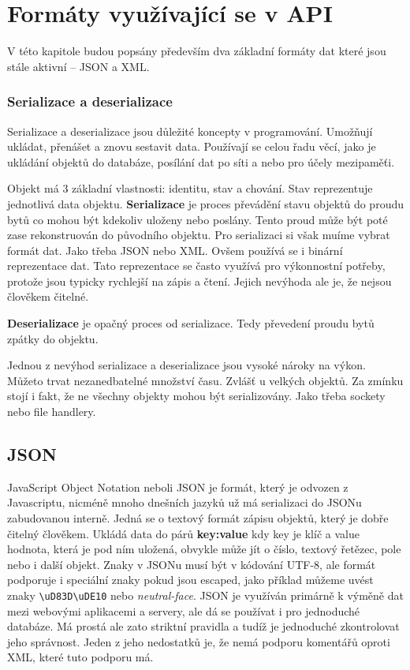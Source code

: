 \chapter{Formáty využívající se v API}
V této kapitole budou popsány především dva základní formáty dat které jsou stále aktivní -- JSON a XML.


\subsection*{Serializace a deserializace} %
Serializace a deserializace jsou důležité koncepty v programování. Umožňují ukládat, přenášet a znovu sestavit data. Používají se celou řadu věcí, jako je ukládání objektů do databáze, posílání dat po síti a nebo pro účely mezipaměťi.

Objekt má 3 základní vlastnosti: identitu, stav a chování. Stav reprezentuje jednotlivá data objektu.
\textbf{Serializace} je proces převádění stavu objektů do proudu bytů co mohou být kdekoliv uloženy nebo poslány. Tento proud může být poté zase rekonstruován do původního objektu. Pro serializaci si však muíme vybrat formát dat. Jako třeba JSON nebo XML. Ovšem používá se i binární reprezentace dat. Tato reprezentace se často využívá pro výkonnostní potřeby, protože jsou typicky rychlejší na zápis a čtení. Jejich nevýhoda ale je, že nejsou člověkem čitelné.

\textbf{Deserializace} je opačný proces od serializace. Tedy převedení proudu bytů zpátky do objektu.

Jednou z nevýhod serializace a deserializace jsou vysoké nároky na výkon. Můžeto trvat nezanedbatelné množství času. Zvlášť u velkých objektů. Za zmínku stojí i fakt, že ne všechny objekty mohou být serializovány. Jako třeba sockety nebo file handlery.


\section{JSON}
JavaScript Object Notation neboli JSON je formát, který je odvozen z Javascriptu, nicméně mnoho dnešních jazyků už má serializaci do JSONu zabudovanou interně. Jedná se o textový formát zápisu objektů, který je dobře čitelný člověkem. Ukládá data do párů \textbf{key:value} kdy key je klíč a value hodnota, která je pod ním uložená, obvykle může jít o číslo, textový řetězec, pole nebo i další objekt. Znaky v JSONu musí být v kódování UTF-8, ale formát podporuje i speciální znaky pokud jsou escaped, jako příklad můžeme uvést znaky \verb |\uD83D\uDE10| nebo \textit{neutral-face}. JSON je využíván primárně k výměně dat mezi webovými aplikacemi a servery, ale dá se používat i pro jednoduché databáze. Má prostá ale zato striktní pravidla a tudíž je jednoduché zkontrolovat jeho správnost. Jeden z jeho nedostatků je, že nemá podporu komentářů oproti XML, které tuto podporu má. %


